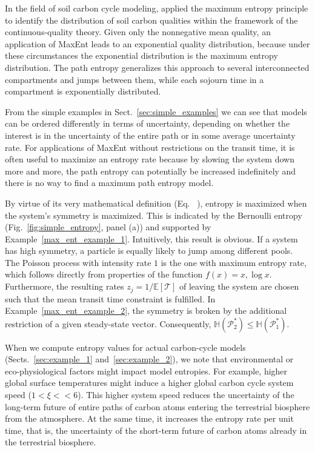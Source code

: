 \documentclass[smallextended]{svjour3}
\makeatletter
\renewcommand*{\eqref}[1]{%
  \hyperref[{#1}]{\textup{\tagform@{\ref*{#1}}}}%
}
\newcommand{\E}{\mathbb{E}}
\newcommand{\TT}{\mathcal{T}}
\renewcommand{\H}{\mathbb{H}}
\newcommand{\ie}{that is}
\makeatother
\begin{document}
In the field of soil carbon cycle modeling, \citet{Agren2021BGC} applied the maximum entropy principle to identify the distribution of soil carbon qualities within the framework of the continuous-quality theory.
Given only the nonnegative mean quality, an application of MaxEnt leads to an exponential quality distribution, because under these circumstances the exponential distribution is the maximum entropy distribution.
The path entropy generalizes this approach to several interconnected compartments and jumps between them, while each sojourn time in a compartment is exponentially distributed.

From the simple examples in Sect.~\ref{sec:simple_examples} we can see that models can be ordered differently in terms of uncertainty, depending on whether the interest is in the uncertainty of the entire path or in some average uncertainty rate.
For applications of MaxEnt without restrictions on the transit time, it is often useful to maximize an entropy rate because by slowing the system down more and more, the path entropy can potentially be increased indefinitely and there is no way to find a maximum path entropy model.

By virtue of its very mathematical definition (Eq.~\eqref{eqn:entropy}), entropy is maximized when the system's symmetry is maximized.
This is indicated by the Bernoulli entropy (Fig.~\ref{fig:simple_entropy}, panel (a)) and supported by Example~\ref{max_ent_example_1}.
Intuitively, this result is obvious.
If a system has high symmetry, a particle is equally likely to jump among different pools.
The Poisson process with intensity rate $1$ is the one with maximum entropy rate, which follows directly from properties of the function $f(x) = x,\log x$.
Furthermore, the resulting rates $z_j = 1/\E\left[\TT\right]$ of leaving the system are chosen such that the mean transit time constraint is fulfilled. 
In Example~\ref{max_ent_example_2}, the symmetry is broken by the additional restriction of a given steady-state vector.
Consequently, $\H(\mathcal{P}^\ast_2) \leq \H(\mathcal{P}^\ast_1)$.

When we compute entropy values for actual carbon-cycle models (Sects.~\ref{sec:example_1} and~\ref{sec:example_2}), we note that environmental or eco-physiological factors might impact model entropies.
For example, higher global surface temperatures might induce a higher global carbon cycle system speed ($1 < \xi << 6$).
This higher system speed reduces the uncertainty of the long-term future of entire paths of carbon atoms entering the terrestrial biosphere from the atmosphere.
At the same time, it increases the entropy rate per unit time, \ie, the uncertainty of the short-term future of carbon atoms already in the terrestrial biosphere.
\end{document}
